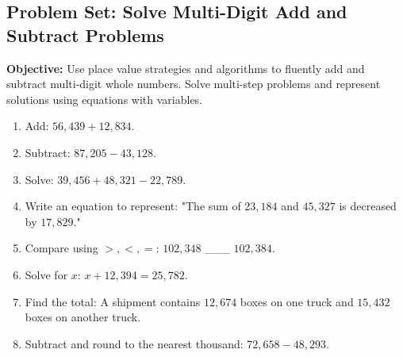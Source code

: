 \documentclass[12pt]{article}
\title{}
\date{}
\begin{document}
\subsection*{ Problem Set: Solve Multi-Digit Add and Subtract Problems}
\onehalfspacing

\begin{tcolorbox}[colframe=black!40, colback=gray!5, 
coltitle=black, colbacktitle=black!20, fonttitle=\bfseries\Large, 
title=Learning Objective, halign title=center, left=5pt, right=5pt, top=5pt, bottom=15pt]
\textbf{Objective:} Use place value strategies and algorithms to fluently add and subtract multi-digit whole numbers. Solve multi-step problems and represent solutions using equations with variables.
\end{tcolorbox}

\begin{tcolorbox}[colframe=black!60, colback=white, 
coltitle=black, colbacktitle=black!15, fonttitle=\bfseries\Large, 
title=Exercises, halign title=center, left=10pt, right=10pt, top=10pt, bottom=30pt]
\begin{enumerate}[itemsep=3em]
    \item Add: \( 56,439 + 12,834 \). 

    \item Subtract: \( 87,205 - 43,128 \). 

    \item Solve: \( 39,456 + 48,321 - 22,789 \). 

    \item Write an equation to represent: "The sum of \( 23,184 \) and \( 45,327 \) is decreased by \( 17,829 \)." 

    \item Compare using \( >, <, = \): \( 102,348 \) \_\_\_ \( 102,384 \). 
    \item Solve for \( x \): \( x + 12,394 = 25,782 \). 

    \item Find the total: A shipment contains \( 12,674 \) boxes on one truck and \( 15,432 \) boxes on another truck. 

    \item Subtract and round to the nearest thousand: \( 72,658 - 48,293 \). \vspace{1cm}

\end{enumerate}
\end{tcolorbox}

\vspace{1em}
\end{document}
